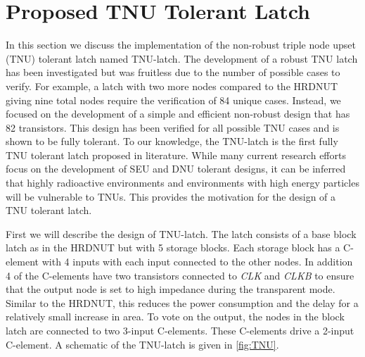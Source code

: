 \section{Proposed TNU Tolerant Latch} \label{sec:TNU}

In this section we discuss the implementation of the non-robust triple node upset (TNU) tolerant latch named TNU-latch. The development of a robust TNU latch has been investigated but was fruitless due to the number of possible cases to verify. For example, a latch with two more nodes compared to the HRDNUT giving nine total nodes require the verification of 84 unique cases. Instead, we focused on the development of a simple and efficient non-robust design that has 82 transistors. This design has been verified for all possible TNU cases and is shown to be fully tolerant. To our knowledge, the TNU-latch is the first fully TNU tolerant latch proposed in literature. While many current research efforts focus on the development of SEU and DNU tolerant designs, it can be inferred that highly radioactive environments and environments with high energy particles will be vulnerable to TNUs. This provides the motivation for the design of a TNU tolerant latch.

First we will describe the design of TNU-latch. The latch consists of a base block latch as in the HRDNUT but with 5 storage blocks. Each storage block has a C-element with 4 inputs with each input connected to the other nodes. In addition 4 of the C-elements have two transistors connected to \textit{CLK} and \textit{CLKB} to ensure that the output node is set to high impedance during the transparent mode. Similar to the HRDNUT, this reduces the power consumption and the delay for a relatively small increase in area. To vote on the output, the nodes in the block latch are connected to two 3-input C-elements. These C-elements drive a 2-input C-element. A schematic of the TNU-latch is given in \ref{fig:TNU}.

